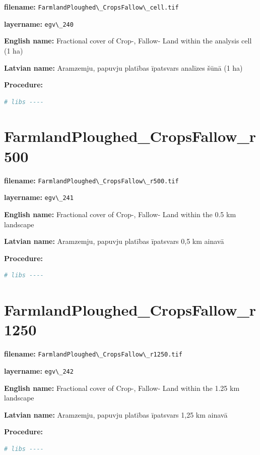\documentclass[
]{book}
\newcommand{\passthrough}[1]{#1}
\begin{document}
\textbf{filename:} \passthrough{\lstinline!FarmlandPloughed\_CropsFallow\_cell.tif!}

\textbf{layername:} \passthrough{\lstinline!egv\_240!}

\textbf{English name:} Fractional cover of Crop-, Fallow- Land within the analysis cell (1 ha)

\textbf{Latvian name:} Aramzemju, papuvju platības īpatsvars analīzes šūnā (1 ha)

\textbf{Procedure:}

\begin{lstlisting}[language=R]
# libs ----
\end{lstlisting}

\section{FarmlandPloughed\_CropsFallow\_r500}\label{ch06.241}

\textbf{filename:} \passthrough{\lstinline!FarmlandPloughed\_CropsFallow\_r500.tif!}

\textbf{layername:} \passthrough{\lstinline!egv\_241!}

\textbf{English name:} Fractional cover of Crop-, Fallow- Land within the 0.5 km landscape

\textbf{Latvian name:} Aramzemju, papuvju platības īpatsvars 0,5 km ainavā

\textbf{Procedure:}

\begin{lstlisting}[language=R]
# libs ----
\end{lstlisting}

\section{FarmlandPloughed\_CropsFallow\_r1250}\label{ch06.242}

\textbf{filename:} \passthrough{\lstinline!FarmlandPloughed\_CropsFallow\_r1250.tif!}

\textbf{layername:} \passthrough{\lstinline!egv\_242!}

\textbf{English name:} Fractional cover of Crop-, Fallow- Land within the 1.25 km landscape

\textbf{Latvian name:} Aramzemju, papuvju platības īpatsvars 1,25 km ainavā

\textbf{Procedure:}

\begin{lstlisting}[language=R]
# libs ----
\end{lstlisting}
\end{document}
